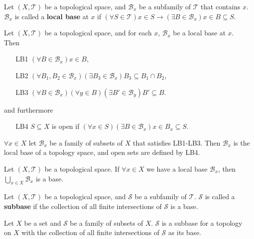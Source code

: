 \documentclass[12pt]{book}
\begin{document}
\begin{definition}
	Let $(X,\mathcal T)$ be a topological space, and $\mathcal B_x$ be a subfamily of $\mathcal T$ that contains $x$. $\mathcal B_x$ is called a {\bf local base} at $x$ if $(\forall S\in \mathcal T)x\in S \rightarrow(\exists B\in \mathcal B_x)x\in B\subseteq S$. 
\end{definition}

\begin{lemma}
	Let $(X,\mathcal T)$ be a topological space, and for each $x$, $\mathcal B_x$ be a local base at $x$. Then
	\begin{enumerate}
		\item [LB1] $(\forall B\in \mathcal B_x)x\in B$,
		\item [LB2] $(\forall B_1,B_2\in \mathcal B_x)(\exists B_3\in \mathcal B_x) B_3\subseteq B_1\cap B_2$,
		\item [LB3] $(\forall B\in \mathcal B_x )(\forall y\in B )(\exists B'\in \mathcal B_y)B'\subseteq B$.
	\end{enumerate}
	and furthermore
	\begin{enumerate}
		\item[LB4] $S\subseteq X$ is open if $(\forall x\in S)(\exists B\in \mathcal B_x)x\in B_x\subseteq S$.
	\end{enumerate}
	
	$\forall x\in X$ let $\mathcal B_x$ be a family of subsets of $X$ that satisfies LB1-LB3. Then $\mathcal B_x$ is the local base of a topology space, and open sets are defined by LB4.
\end{lemma}

\begin{lemma}
	Let $(X,\mathcal T)$ be a topological space. If $\forall x\in X$ we have a local base $\mathcal B_x$, then $\bigcup_{x\in X}\mathcal B_x$ is a base.
\end{lemma}

\begin{definition}
	Let $(X,\mathcal T)$ be a topological space, and $\mathcal S$ be a subfamily of $\mathcal T$. $\mathcal S$ is called a {\bf subbase} if the collection of all finite intersections of $\mathcal S$ is a base.
\end{definition}

\begin{lemma}
	Let $X$ be a set and $\mathcal S$ be a family of subsets of $X$. $\mathcal S$ is a subbase for a topology on $X$ with the collection of all finite intersections of $\mathcal S$ as its base.
\end{lemma}
\end{document}
